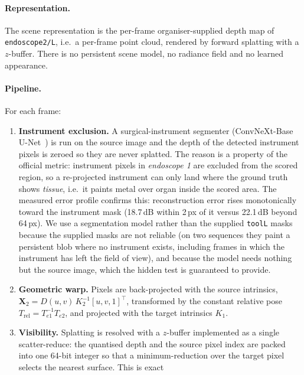 \paragraph{Representation.} The scene representation is the per-frame organiser-supplied depth map of
\texttt{endoscope2/L}, i.e.\ a per-frame point cloud, rendered by forward splatting with a $z$-buffer.
There is no persistent scene model, no radiance field and no learned appearance.

\paragraph{Pipeline.} For each frame:
\begin{enumerate}\itemsep2pt
  \item \textbf{Instrument exclusion.} A surgical-instrument segmenter (ConvNeXt-Base
        U-Net~\cite{liu2022convnext,ronneberger2015unet}) is run on the source image and the depth of the
        detected instrument pixels is zeroed so they are never splatted. The reason is a property of the
        official metric: instrument pixels in \emph{endoscope 1} are excluded from the scored region, so a
        re-projected instrument can only land where the ground truth shows \emph{tissue}, i.e.\ it paints
        metal over organ inside the scored area. The measured error profile confirms this: reconstruction
        error rises monotonically toward the instrument mask (18.7\,dB within 2\,px of it versus 22.1\,dB
        beyond 64\,px). We use a segmentation model rather than the supplied \texttt{toolL} masks because
        the supplied masks are not reliable (on two sequences they paint a persistent blob where no
        instrument exists, including frames in which the instrument has left the field of view), and
        because the model needs nothing but the source image, which the hidden test is guaranteed to
        provide.
  \item \textbf{Geometric warp.} Pixels are back-projected with the source intrinsics,
        $\mathbf{X}_2 = D(u,v)\,K_2^{-1}[u,v,1]^{\!\top}$, transformed by the constant relative pose
        $T_{\mathrm{rel}} = T_{e1}^{-1}T_{e2}$, and projected with the target intrinsics $K_1$.
  \item \textbf{Visibility.} Splatting is resolved with a $z$-buffer implemented as a single
        scatter-reduce: the quantised depth and the source pixel index are packed into one 64-bit integer
        so that a minimum-reduction over the target pixel selects the nearest surface. This is exact

\end{enumerate}
